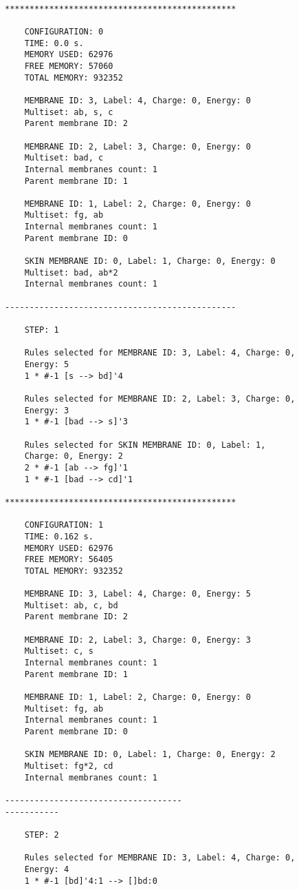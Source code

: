 \documentclass{acm_proc_article-sp}
\begin{document}
\begin{lstlisting}

***********************************************

    CONFIGURATION: 0
    TIME: 0.0 s.
    MEMORY USED: 62976
    FREE MEMORY: 57060
    TOTAL MEMORY: 932352

    MEMBRANE ID: 3, Label: 4, Charge: 0, Energy: 0
    Multiset: ab, s, c
    Parent membrane ID: 2

    MEMBRANE ID: 2, Label: 3, Charge: 0, Energy: 0
    Multiset: bad, c
    Internal membranes count: 1
    Parent membrane ID: 1

    MEMBRANE ID: 1, Label: 2, Charge: 0, Energy: 0
    Multiset: fg, ab
    Internal membranes count: 1
    Parent membrane ID: 0

    SKIN MEMBRANE ID: 0, Label: 1, Charge: 0, Energy: 0
    Multiset: bad, ab*2
    Internal membranes count: 1

-----------------------------------------------

    STEP: 1

    Rules selected for MEMBRANE ID: 3, Label: 4, Charge: 0, 
    Energy: 5
    1 * #-1 [s --> bd]'4

    Rules selected for MEMBRANE ID: 2, Label: 3, Charge: 0, 
    Energy: 3
    1 * #-1 [bad --> s]'3

    Rules selected for SKIN MEMBRANE ID: 0, Label: 1, 
    Charge: 0, Energy: 2
    2 * #-1 [ab --> fg]'1
    1 * #-1 [bad --> cd]'1

***********************************************

    CONFIGURATION: 1
    TIME: 0.162 s.
    MEMORY USED: 62976
    FREE MEMORY: 56405
    TOTAL MEMORY: 932352

    MEMBRANE ID: 3, Label: 4, Charge: 0, Energy: 5
    Multiset: ab, c, bd
    Parent membrane ID: 2

    MEMBRANE ID: 2, Label: 3, Charge: 0, Energy: 3
    Multiset: c, s
    Internal membranes count: 1
    Parent membrane ID: 1

    MEMBRANE ID: 1, Label: 2, Charge: 0, Energy: 0
    Multiset: fg, ab
    Internal membranes count: 1
    Parent membrane ID: 0

    SKIN MEMBRANE ID: 0, Label: 1, Charge: 0, Energy: 2
    Multiset: fg*2, cd
    Internal membranes count: 1

------------------------------------
-----------

    STEP: 2

    Rules selected for MEMBRANE ID: 3, Label: 4, Charge: 0, 
    Energy: 4
    1 * #-1 [bd]'4:1 --> []bd:0


\end{lstlisting}
\end{document}
